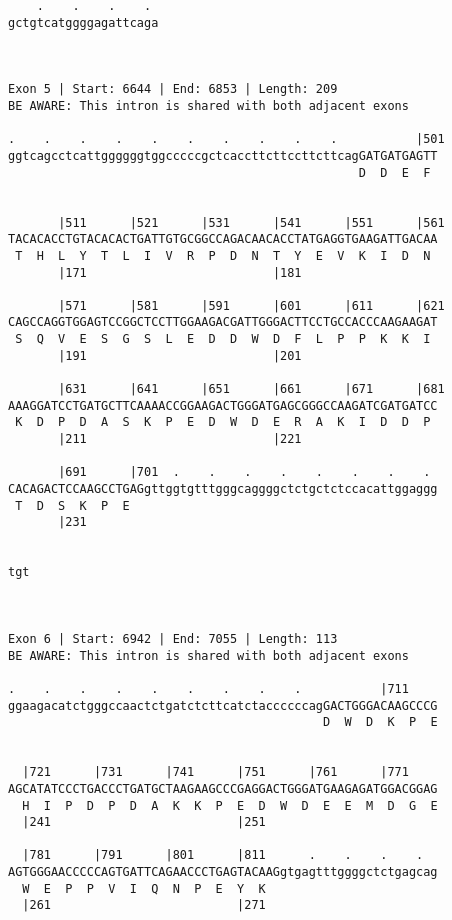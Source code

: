 \documentclass{article}
\begin{document}
\begin{Verbatim}
    .    .    .    . 
gctgtcatggggagattcaga
                     
                     
 
Exon 5 | Start: 6644 | End: 6853 | Length: 209
BE AWARE: This intron is shared with both adjacent exons
 
.    .    .    .    .    .    .    .    .    .           |501
ggtcagcctcattggggggtggcccccgctcaccttcttccttcttcagGATGATGAGTT
                                                 D  D  E  F 
                                                            
  
       |511      |521      |531      |541      |551      |561
TACACACCTGTACACACTGATTGTGCGGCCAGACAACACCTATGAGGTGAAGATTGACAA
 T  H  L  Y  T  L  I  V  R  P  D  N  T  Y  E  V  K  I  D  N 
       |171                          |181                   
  
       |571      |581      |591      |601      |611      |621
CAGCCAGGTGGAGTCCGGCTCCTTGGAAGACGATTGGGACTTCCTGCCACCCAAGAAGAT
 S  Q  V  E  S  G  S  L  E  D  D  W  D  F  L  P  P  K  K  I 
       |191                          |201                   
  
       |631      |641      |651      |661      |671      |681
AAAGGATCCTGATGCTTCAAAACCGGAAGACTGGGATGAGCGGGCCAAGATCGATGATCC
 K  D  P  D  A  S  K  P  E  D  W  D  E  R  A  K  I  D  D  P 
       |211                          |221                   
  
       |691      |701  .    .    .    .    .    .    .    . 
CACAGACTCCAAGCCTGAGgttggtgtttgggcaggggctctgctctccacattggaggg
 T  D  S  K  P  E                                           
       |231                                                 
  
   
tgt
   
   
 
Exon 6 | Start: 6942 | End: 7055 | Length: 113
BE AWARE: This intron is shared with both adjacent exons
 
.    .    .    .    .    .    .    .    .           |711    
ggaagacatctgggccaactctgatctcttcatctaccccccagGACTGGGACAAGCCCG
                                            D  W  D  K  P  E
                                                            
  
  |721      |731      |741      |751      |761      |771    
AGCATATCCCTGACCCTGATGCTAAGAAGCCCGAGGACTGGGATGAAGAGATGGACGGAG
  H  I  P  D  P  D  A  K  K  P  E  D  W  D  E  E  M  D  G  E
  |241                          |251                        
  
  |781      |791      |801      |811      .    .    .    .  
AGTGGGAACCCCCAGTGATTCAGAACCCTGAGTACAAGgtgagtttggggctctgagcag
  W  E  P  P  V  I  Q  N  P  E  Y  K                        
  |261                          |271                        
  

\end{Verbatim}
\end{document}
